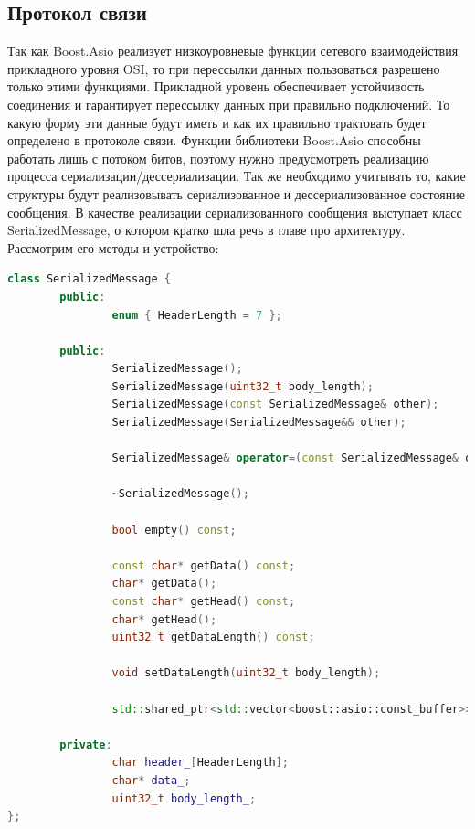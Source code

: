 \documentclass[a4paper, 14pt]{extreport}
\begin{document}
\subsection{Протокол связи}
\par Так как Boost.Asio реализует низкоуровневые функции сетевого взаимодействия прикладного уровня OSI, то при перессылки данных
пользоваться разрешено только этими функциями. Прикладной уровень обеспечивает устойчивость соединения и гарантирует перессылку данных 
при правильно подключений. То какую форму эти данные будут иметь и как их правильно трактовать будет определено в протоколе связи.
Функции библиотеки Boost.Asio способны работать лишь с потоком битов, поэтому нужно предусмотреть реализацию процесса 
сериализации/дессериализации. Так же необходимо учитывать то, какие структуры будут реализовывать сериализованное и дессериализованное 
состояние сообщения. В качестве реализации сериализованного сообщения выступает класс SerializedMessage, о котором кратко шла речь в 
главе про архитектуру. Рассмотрим его методы и устройство:
\begin{lstlisting}[language=C++, frame=single, xleftmargin=15pt, caption={Заголовочный файл класса SerializedMessage},label=DescriptiveLabel]
class SerializedMessage {
        public:
                enum { HeaderLength = 7 };
        
        public:
                SerializedMessage();
                SerializedMessage(uint32_t body_length);
                SerializedMessage(const SerializedMessage& other);
                SerializedMessage(SerializedMessage&& other);
        
                SerializedMessage& operator=(const SerializedMessage& other);
        
                ~SerializedMessage();
        
                bool empty() const;
        
                const char* getData() const;
                char* getData();
                const char* getHead() const;
                char* getHead();
                uint32_t getDataLength() const;
        
                void setDataLength(uint32_t body_length);
        
                std::shared_ptr<std::vector<boost::asio::const_buffer>> toVecOfConstBuf() const;
        
        private:
                char header_[HeaderLength];
                char* data_;
                uint32_t body_length_;
};
\end{lstlisting}
\end{document}
